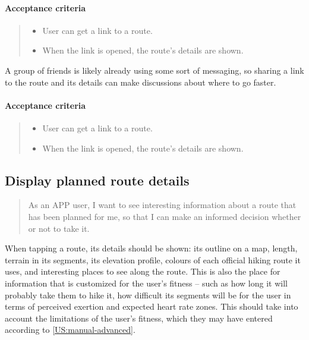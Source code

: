 \paragraph*{Acceptance criteria}
\begin{quote}
    \begin{itemize}
        \item User can get a link to a route.
        \item When the link is opened, the route's details are shown.
    \end{itemize}
\end{quote}

A group of friends is likely already using some sort of messaging, so sharing a link to the route and its details can make discussions about where to go faster.

\paragraph*{Acceptance criteria}
\begin{quote}
    \begin{itemize}
        \item User can get a link to a route.
        \item When the link is opened, the route's details are shown.
    \end{itemize}
\end{quote}

\subsection{Display planned route details}\label{US:map-planned-details}
\begin{quote}
As an APP user, I want to see interesting information about a route that has been planned for me, so that I can make an informed decision whether or not to take it.
\end{quote}

When tapping a route, its details should be shown: its outline on a map, length, terrain in its segments, its elevation profile, colours of each official hiking route it uses, and interesting places to see along the route.
This is also the place for information that is customized for the user's fitness -- such as how long it will probably take them to hike it, how difficult its segments will be for the user in terms of perceived exertion and expected heart rate zones.
This should take into account the limitations of the user's fitness, which they may have entered according to \ref{US:manual-advanced}.

